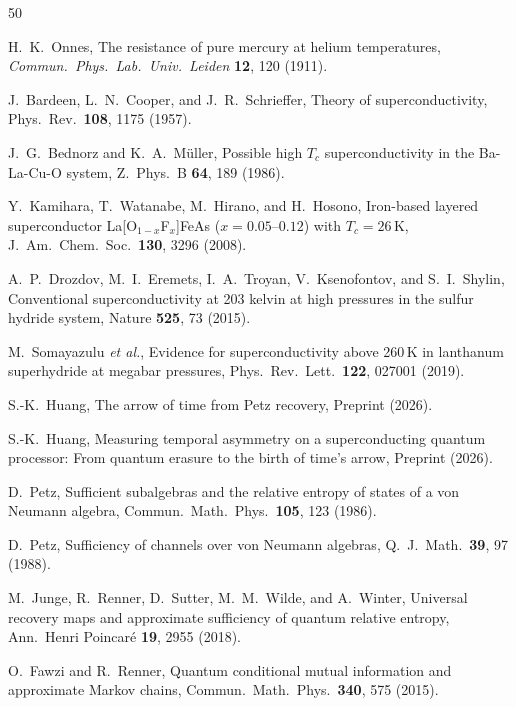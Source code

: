 \documentclass[prb,twocolumn,superscriptaddress,longbibliography,floatfix]{revtex4-2}
\begin{document}
\begin{thebibliography}{50}

H.~K.~Onnes,
The resistance of pure mercury at helium temperatures,
\textit{Commun.\ Phys.\ Lab.\ Univ.\ Leiden} \textbf{12}, 120 (1911).

J.~Bardeen, L.~N.~Cooper, and J.~R.~Schrieffer,
Theory of superconductivity,
Phys.\ Rev.\ \textbf{108}, 1175 (1957).

J.~G.~Bednorz and K.~A.~M\"uller,
Possible high $T_c$ superconductivity in the Ba-La-Cu-O system,
Z.\ Phys.\ B \textbf{64}, 189 (1986).

Y.~Kamihara, T.~Watanabe, M.~Hirano, and H.~Hosono,
Iron-based layered superconductor La[O$_{1-x}$F$_x$]FeAs ($x = 0.05$--$0.12$) with $T_c = 26\,$K,
J.\ Am.\ Chem.\ Soc.\ \textbf{130}, 3296 (2008).

A.~P.~Drozdov, M.~I.~Eremets, I.~A.~Troyan, V.~Ksenofontov, and S.~I.~Shylin,
Conventional superconductivity at 203 kelvin at high pressures in the sulfur hydride system,
Nature \textbf{525}, 73 (2015).

M.~Somayazulu \textit{et al.},
Evidence for superconductivity above 260\,K in lanthanum superhydride at megabar pressures,
Phys.\ Rev.\ Lett.\ \textbf{122}, 027001 (2019).

S.-K.~Huang,
The arrow of time from Petz recovery,
Preprint (2026).

S.-K.~Huang,
Measuring temporal asymmetry on a superconducting quantum processor:
From quantum erasure to the birth of time's arrow,
Preprint (2026).

D.~Petz,
Sufficient subalgebras and the relative entropy of states of a von Neumann algebra,
Commun.\ Math.\ Phys.\ \textbf{105}, 123 (1986).

D.~Petz,
Sufficiency of channels over von Neumann algebras,
Q.\ J.\ Math.\ \textbf{39}, 97 (1988).

M.~Junge, R.~Renner, D.~Sutter, M.~M.~Wilde, and A.~Winter,
Universal recovery maps and approximate sufficiency of quantum relative entropy,
Ann.\ Henri Poincar\'e \textbf{19}, 2955 (2018).

O.~Fawzi and R.~Renner,
Quantum conditional mutual information and approximate Markov chains,
Commun.\ Math.\ Phys.\ \textbf{340}, 575 (2015).


\end{thebibliography}
\end{document}
